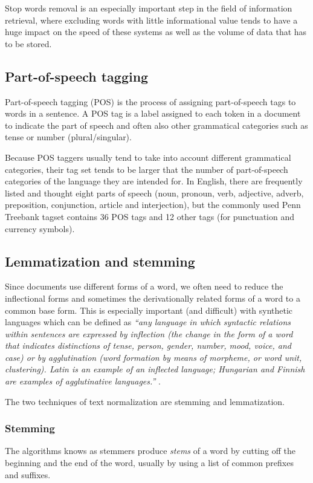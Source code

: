 Stop words removal is an especially important step in the field of information retrieval, where excluding words with little informational value tends to have a huge impact on the speed of these systems as well as the volume of data that has to be stored.
\subsection{Part-of-speech tagging}
\label{sec:pos}
Part-of-speech tagging (POS) is the process of assigning part-of-speech tags to words in a sentence. A POS tag is a label assigned to each token in a document to indicate the part of speech  and often also other grammatical categories such as tense or number (plural/singular). \cite{pos}

Because POS taggers usually tend to take into account different grammatical categories, their tag set tends to be larger that the number of part-of-speech categories of the language they are intended for. In English, there are frequently listed and thought eight parts of speech (noun, pronoun, verb, adjective, adverb, preposition, conjunction, article and interjection), but the commonly used Penn Treebank tagset contains 36 POS tags and 12 other tags (for punctuation and currency symbols). \cite{penn_treebank}
\subsection{Lemmatization and stemming}
Since documents use different forms of a word, we often need to reduce the inflectional forms and sometimes the derivationally related forms of a word to a common base form. This is especially important (and difficult) with synthetic languages which can be defined as \textit{``any language in which syntactic relations within sentences are expressed by inflection (the change in the form of a word that indicates distinctions of tense, person, gender, number, mood, voice, and case) or by agglutination (word formation by means of morpheme, or word unit, clustering). Latin is an example of an inflected language; Hungarian and Finnish are examples of agglutinative languages.''} \cite{synthetic_lang}.

The two techniques of text normalization are stemming and lemmatization.
\subsubsection{Stemming}
The algorithms knows as stemmers produce \textit{stems} of a word by cutting off the beginning and the end of the word, usually by using a list of common prefixes and suffixes. \cite{stemming_vs_lemmatization}

